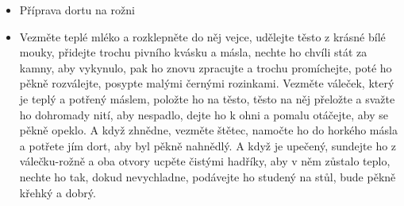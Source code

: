 \begin{itemize}
\begin{itemize}
\begin{itemize}
      \begin{itemize}
      \tightlist
      \item
        Příprava dortu na rožni
      \item
        Vezměte teplé mléko a rozklepněte do něj vejce, udělejte těsto z
        krásné bílé mouky, přidejte trochu pivního kvásku a másla,
        nechte ho chvíli stát za kamny, aby vykynulo, pak ho znovu
        zpracujte a trochu promíchejte, poté ho pěkně rozválejte,
        posypte malými černými rozinkami. Vezměte váleček, který je
        teplý a potřený máslem, položte ho na těsto, těsto na něj
        přeložte a svažte ho dohromady nití, aby nespadlo, dejte ho k
        ohni a pomalu otáčejte, aby se pěkně opeklo. A když zhnědne,
        vezměte štětec, namočte ho do horkého másla a potřete jím dort,
        aby byl pěkně nahnědlý. A když je upečený, sundejte ho z
        válečku-rožně a oba otvory ucpěte čistými hadříky, aby v něm
        zůstalo teplo, nechte ho tak, dokud nevychladne, podávejte ho
        studený na stůl, bude pěkně křehký a dobrý.
      \end{itemize}
    \end{itemize}
  \end{itemize}
\end{itemize}

